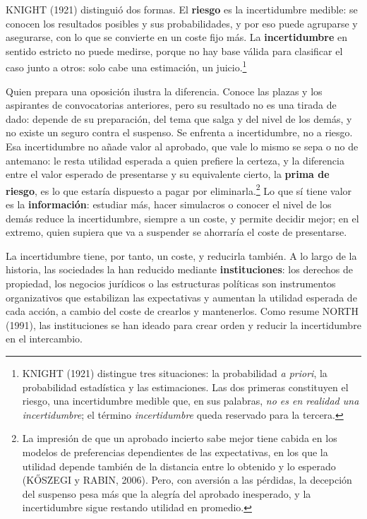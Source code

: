 \documentclass[10pt,a4paper]{article}
\begin{document}
KNIGHT (1921) distinguió dos formas. El \textbf{riesgo} es la incertidumbre medible: se conocen los resultados posibles y sus probabilidades, y por eso puede agruparse y asegurarse, con lo que se convierte en un coste fijo más. La \textbf{incertidumbre} en sentido estricto no puede medirse, porque no hay base válida para clasificar el caso junto a otros: solo cabe una estimación, un juicio.\footnote{%
    KNIGHT (1921) distingue tres situaciones: la probabilidad \textit{a priori}, la probabilidad estadística y las estimaciones. Las dos primeras constituyen el riesgo, una incertidumbre medible que, en sus palabras, \textit{no es en realidad una incertidumbre}; el término \textit{incertidumbre} queda reservado para la tercera.
}

Quien prepara una oposición ilustra la diferencia. Conoce las plazas y los aspirantes de convocatorias anteriores, pero su resultado no es una tirada de dado: depende de su preparación, del tema que salga y del nivel de los demás, y no existe un seguro contra el suspenso. Se enfrenta a incertidumbre, no a riesgo. Esa incertidumbre no añade valor al aprobado, que vale lo mismo se sepa o no de antemano: le resta utilidad esperada a quien prefiere la certeza, y la diferencia entre el valor esperado de presentarse y su equivalente cierto, la \textbf{prima de riesgo}, es lo que estaría dispuesto a pagar por eliminarla.\footnote{%
    La impresión de que un aprobado incierto sabe mejor tiene cabida en los modelos de preferencias dependientes de las expectativas, en los que la utilidad depende también de la distancia entre lo obtenido y lo esperado (K\H{O}SZEGI y RABIN, 2006). Pero, con aversión a las pérdidas, la decepción del suspenso pesa más que la alegría del aprobado inesperado, y la incertidumbre sigue restando utilidad en promedio.
} Lo que sí tiene valor es la \textbf{información}: estudiar más, hacer simulacros o conocer el nivel de los demás reduce la incertidumbre, siempre a un coste, y permite decidir mejor; en el extremo, quien supiera que va a suspender se ahorraría el coste de presentarse.

La incertidumbre tiene, por tanto, un coste, y reducirla también. A lo largo de la historia, las sociedades la han reducido mediante \textbf{instituciones}: los derechos de propiedad, los negocios jurídicos o las estructuras políticas son instrumentos organizativos que estabilizan las expectativas y aumentan la utilidad esperada de cada acción, a cambio del coste de crearlos y mantenerlos. Como resume NORTH (1991), las instituciones se han ideado para crear orden y reducir la incertidumbre en el intercambio.
\end{document}
